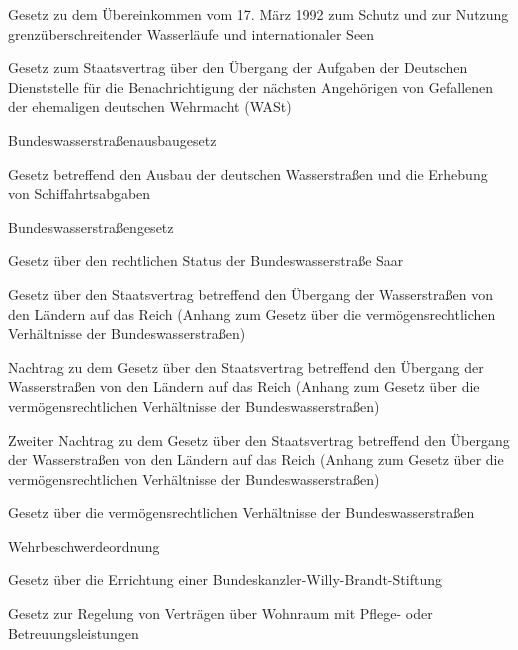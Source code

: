 \item[{WassLÜbkG}] Gesetz zu dem Übereinkommen vom 17. März 1992 zum Schutz und zur Nutzung grenzüberschreitender Wasserläufe und internationaler Seen

\item[{WAStAÜStVtrG}] Gesetz zum Staatsvertrag über den Übergang der Aufgaben der Deutschen Dienststelle für die Benachrichtigung der nächsten Angehörigen von Gefallenen der ehemaligen deutschen Wehrmacht (WASt)

\item[{WaStrAbG}] Bundeswasserstraßenausbaugesetz

\item[{WaStrAbgG}] Gesetz betreffend den Ausbau der deutschen Wasserstraßen und die Erhebung von Schiffahrtsabgaben

\item[{WaStrG}] Bundeswasserstraßengesetz

\item[{WaStrSaarG}] Gesetz über den rechtlichen Status der Bundeswasserstraße Saar

\item[{WaStrÜbgVtrG}] Gesetz über den Staatsvertrag betreffend den Übergang der Wasserstraßen von den Ländern auf das Reich (Anhang zum Gesetz über die vermögensrechtlichen Verhältnisse der Bundeswasserstraßen)

\item[{WaStrÜbgVtrGNtrag}] Nachtrag zu dem Gesetz über den Staatsvertrag betreffend den Übergang der Wasserstraßen von den Ländern auf das Reich (Anhang zum Gesetz über die vermögensrechtlichen Verhältnisse der Bundeswasserstraßen)

\item[{WaStrÜbgVtrGNtrag-2}] Zweiter Nachtrag zu dem Gesetz über den Staatsvertrag betreffend den Übergang der Wasserstraßen von den Ländern auf das Reich (Anhang zum Gesetz über die vermögensrechtlichen Verhältnisse der Bundeswasserstraßen)

\item[{WaStrVermRG}] Gesetz über die vermögensrechtlichen Verhältnisse der Bundeswasserstraßen

\item[{WBO}] Wehrbeschwerdeordnung

\item[{WBStiftG}] Gesetz über die Errichtung einer Bundeskanzler-Willy-Brandt-Stiftung

\item[{WBVG}] Gesetz zur Regelung von Verträgen über Wohnraum mit Pflege- oder Betreuungsleistungen


